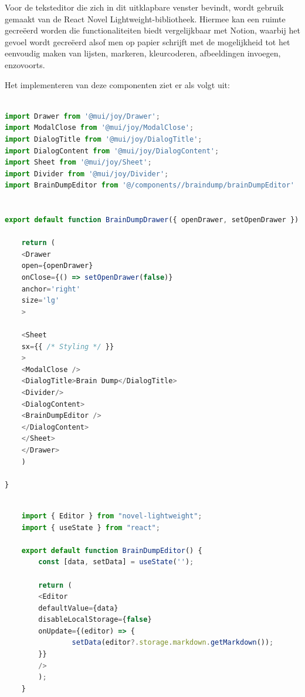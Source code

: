 Voor de teksteditor die zich in dit uitklapbare venster bevindt, wordt gebruik gemaakt van de React Novel Lightweight-bibliotheek. Hiermee kan een ruimte gecreëerd worden die functionaliteiten biedt vergelijkbaar met Notion, waarbij het gevoel wordt gecreëerd alsof men op papier schrijft met de mogelijkheid tot het eenvoudig maken van lijsten, markeren, kleurcoderen, afbeeldingen invoegen, enzovoorts.\newline

Het implementeren van deze componenten ziet er als volgt uit: 

\begin{lstlisting}[language=JavaScript, caption={Code Snippet - Brain Dump Drawer}, label={lst:codesnippet2}, frame=single, breaklines=true, backgroundcolor=\color{lightgray}]
    
import Drawer from '@mui/joy/Drawer';
import ModalClose from '@mui/joy/ModalClose';
import DialogTitle from '@mui/joy/DialogTitle';
import DialogContent from '@mui/joy/DialogContent';
import Sheet from '@mui/joy/Sheet';
import Divider from '@mui/joy/Divider';
import BrainDumpEditor from '@/components//braindump/brainDumpEditor'


export default function BrainDumpDrawer({ openDrawer, setOpenDrawer }) {
    
    return (
    <Drawer
    open={openDrawer}
    onClose={() => setOpenDrawer(false)}
    anchor='right'
    size='lg'
    >
    
    <Sheet
    sx={{ /* Styling */ }}
    >
    <ModalClose />
    <DialogTitle>Brain Dump</DialogTitle>
    <Divider/>
    <DialogContent>
    <BrainDumpEditor />
    </DialogContent>
    </Sheet>
    </Drawer>
    )
    
}

\end{lstlisting}

\begin{lstlisting}[language=JavaScript, caption={Code Snippet - Text Editor}, label={lst:codesnippet3}, frame=single, breaklines=true, backgroundcolor=\color{lightgray}]
    
    import { Editor } from "novel-lightweight";
    import { useState } from "react";
    
    export default function BrainDumpEditor() {
        const [data, setData] = useState('');
        
        return (
        <Editor
        defaultValue={data}
        disableLocalStorage={false}
        onUpdate={(editor) => {
                setData(editor?.storage.markdown.getMarkdown());
        }}
        />
        );
    }
    
\end{lstlisting}

